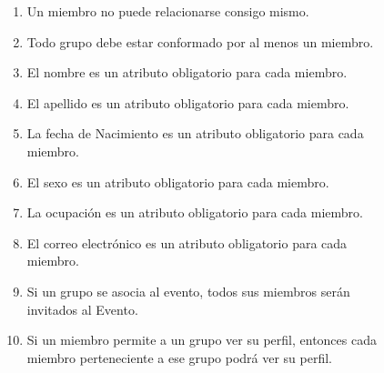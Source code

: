 \documentclass{article}
\begin{document}
\begin{figure}[h]
\begin{enumerate}
\item Un miembro no puede relacionarse consigo mismo.
\newline
\newline
\newline
\newline 
\item Todo grupo debe estar conformado por al menos un miembro.
\newline
\newline
\newline
\newline
\item El nombre es un atributo obligatorio para cada miembro.
\newline
\newline
\newline
\newline
\item El apellido es un atributo obligatorio para cada miembro.
\newline
\newline
\newline
\newline
\item La fecha de Nacimiento es un atributo obligatorio para cada miembro.
\newline
\newline
\newline
\newline
\item El sexo es un atributo obligatorio para cada miembro.
\newline
\newline
\newline
\newline
\item La ocupaci\'on es un atributo obligatorio para cada miembro.
\newline
\newline
\newline
\newline
\item El correo electr\'onico es un atributo obligatorio para cada miembro.
\newline
\newline
\newline
\newline
\item Si un grupo se asocia al evento, todos sus miembros ser\'an invitados al Evento.
\newline
\mewline
\newline
\newline
\item Si un miembro permite a un grupo ver su perfil, entonces cada miembro perteneciente a ese grupo podr\'a ver su perfil.
\newline
\newline
\newline
\newline
\end{enumerate}


\end{figure}
\end{document}
